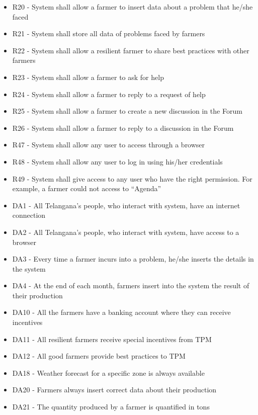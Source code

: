 \begin{enumerate}[label=\textbf{G.\arabic*}]
\begin{enumerate} [label=\textbf{G.4.\arabic*}]
\begin{itemize} [label =]
            \item R20 - System shall allow a farmer to insert data about a problem that he/she faced 
            \item R21 - System shall store all data of problems faced by farmers
            \item R22 - System shall allow a resilient farmer to share best practices with other farmers
            \item R23 - System shall allow a farmer to ask for help
            \item R24 - System shall allow a farmer to reply to a request of help
            \item R25 - System shall allow a farmer to create a new discussion in the Forum
            \item R26 - System shall allow a farmer to reply to a discussion in the Forum
            \item R47 - System shall allow any user to access through a browser
            \item R48 - System shall allow any user to log in using his/her credentials
            \item R49 - System shall give access to any user who have the right permission. For example, a farmer could not access to “Agenda”
            \item DA1 - All Telangana’s people, who interact with system, have an internet connection
            \item DA2 - All Telangana’s people, who interact with system, have access to a browser
            \item DA3 - Every time a farmer incurs into a problem, he/she inserts the details in the system
            \item DA4 - At the end of each month, farmers insert into the system the result of their production
            \item DA10 - All the farmers have a banking account where they can receive incentives
            \item DA11 - All resilient farmers receive special incentives from TPM
            \item DA12 - All good farmers provide best practices to TPM
            \item DA18 - Weather forecast for a specific zone is always available
            \item DA20 - Farmers always insert correct data about their production
            \item DA21 - The quantity produced by a farmer is quantified in tons

\end{itemize}
\end{enumerate}
\end{enumerate}
